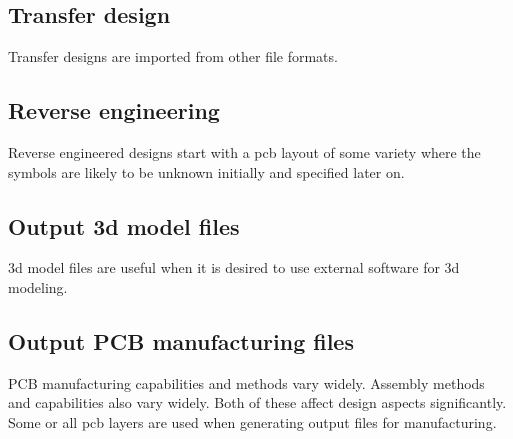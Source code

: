 \documentclass[letterpaper,12pt,twoside]{book}
\begin{document}
\subsection {Transfer design}
Transfer designs are imported from other file formats.

\subsection {Reverse engineering}
Reverse engineered designs start with a pcb layout of some variety where the symbols are likely to be unknown initially and specified later on.

\subsection {Output 3d model files}
3d model files are useful when it is desired to use external software for 3d modeling.

\subsection {Output PCB manufacturing files}
PCB manufacturing capabilities and methods vary widely. Assembly methods and capabilities also vary widely. Both of these affect design aspects significantly. Some or all pcb layers are used when generating output files for manufacturing.
\end{document}
